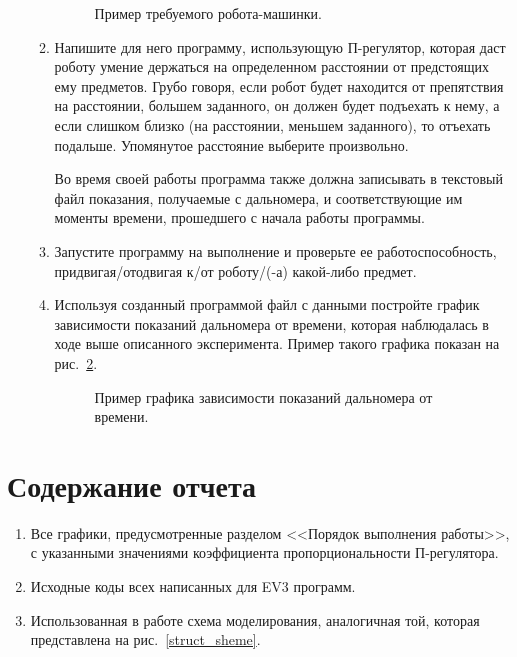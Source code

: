 \documentclass[12pt,a4paper,openany]{extarticle}
\begin{document}
\begin{enumerate}
\begin{enumerate}
\begin{figure}[h!]
\begin{minipage}[h]{0.49\linewidth}
			\end{minipage}
			\caption{Пример требуемого робота-машинки.}
			\label{robocar}
		\end{figure}	
		\item Напишите для него программу, использующую П-регулятор, которая даст роботу умение держаться на определенном расстоянии от предстоящих ему предметов.
		Грубо говоря, если робот будет находится от препятствия на расстоянии, большем заданного, он должен будет подъехать к нему, а если слишком близко (на расстоянии, меньшем заданного), то отъехать подальше.
		Упомянутое расстояние выберите произвольно.

		Во время своей работы программа также должна записывать в текстовый файл показания, получаемые с дальномера, и соответствующие им моменты времени, прошедшего с начала работы программы.
		\item Запустите программу на выполнение и проверьте ее работоспособность, придвигая/отодвигая к/от роботу/(-а) какой-либо предмет.
		\item Используя созданный программой файл с данными постройте график зависимости показаний дальномера от времени, которая наблюдалась в ходе выше описанного эксперимента. Пример такого графика показан на рис.~\ref{distance_with_time}.
		\begin{figure}[h!]
			\caption{Пример графика зависимости показаний дальномера от времени.}
			\label{distance_with_time}
		\end{figure}
	\end{enumerate}
\end{enumerate}
\newpage
\section{Содержание отчета}
\begin{enumerate}
\item Все графики, предусмотренные разделом <<Порядок выполнения работы>>, с указанными значениями коэффициента пропорциональности П-регулятора.
\item Исходные коды всех написанных для EV3 программ.
\item Использованная в работе схема моделирования, аналогичная той, которая представлена на рис.~\ref{struct_sheme}.
\end{enumerate}
\end{document}
